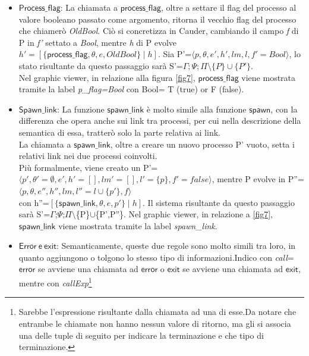 \documentclass[Contributo.tex]{subfiles}
\begin{document}
	\begin{itemize}
		\item $\mathsf{Process\_flag}$: 
		La chiamata a $\mathsf{process\_flag}$, oltre a settare il flag del processo al valore booleano passato come argomento, ritorna il vecchio flag del processo che chiamerò \textit{OldBool}.
		Ciò si concretizza in Cauder, cambiando il campo \textit{f} di P in \textit{f'} settato a \textit{Bool}, mentre \textit{h} di P evolve $\displaystyle h'=[\{\mathsf{process\_flag},\theta,e,OldBool\} \mid h ]$.
		Sia P'=$\displaystyle \langle p,\theta,e',h',lm,l,f'=Bool \rangle$, lo stato risultante da questo passaggio sarà
		S'=$\displaystyle \Gamma;\Psi;\Pi\setminus\{P\}\cup\{P'\}$.\\
		Nel graphic viewer, in relazione alla figura \ref{fig7}, $\mathsf{process\_flag}$ viene mostrata tramite la label \textit{p\_flag=Bool} con Bool= T (true) or F (false).
		\item $\mathsf{Spawn\_link}$: 
		La funzione $\mathsf{spawn\_link}$ è molto simile alla funzione $\mathsf{spawn}$, con la differenza che opera anche sui link tra processi, per cui nella descrizione della semantica di essa, tratterò solo la parte relativa ai link.\\
		La chiamata a $\mathsf{spawn\_link}$, oltre a creare un nuovo processo P' vuoto, setta i relativi link nei due processi coinvolti.\\
		Più formalmente, viene creato un P'=$\displaystyle \langle p',\theta'= \emptyset,e',h'=[],lm'=[],l'=\{p\},f'=false \rangle$, mentre P evolve in P''=$\displaystyle \langle p,\theta,e'',h'',lm,l''=l \cup\{p'\},f \rangle$ \\con h''=$\displaystyle [\{\mathsf{spawn\_link},\theta,e,p'\} \mid h]$.
		Il sistema risultante da questo passaggio sarà S'=$\Gamma$;$\Psi$;$\Pi$$\setminus$\{P\}$\cup$\{P',P''\}.
		Nel graphic viewer, in relazione a \ref{fig7}, $\mathsf{spawn\_link}$ viene mostrata tramite la label \textit{spawn\_link}.
		\item $\mathsf{Error~e~exit}$: 
		Semanticamente, queste due regole sono molto simili tra loro, in quanto aggiungono o tolgono lo stesso tipo di informazioni.Indico con \textit{call}= $\mathsf{error}$ se avviene una chiamata ad $\mathsf{error}$ o $\mathsf{exit}$ se avviene una chiamata ad $\mathsf{exit}$, mentre con \textit{callExp}\footnote{Sarebbe l'espressione risultante dalla chiamata ad una di esse.Da notare che entrambe le chiamate non hanno nessun valore di ritorno, ma gli si associa una delle tuple di seguito per indicare la terminazione e che tipo di terminazione.}
$$
\end{itemize}
\end{document}
